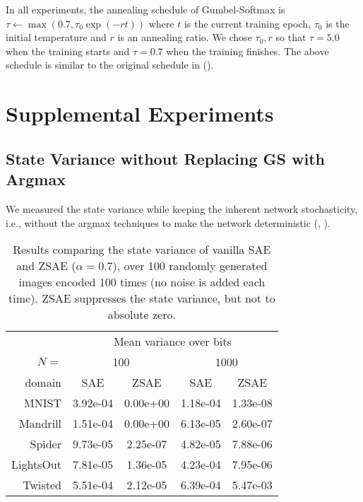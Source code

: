 \documentclass[10pt,letterpaper]{article}
\begin{document}

In all experiments, 
the annealing schedule of Gumbel-Softmax is $\tau \leftarrow \max (0.7, \tau_0\exp(-rt))$ where
 $t$ is the current training epoch, $\tau_0$ is the initial temperature and $r$ is an annealing ratio.
We chose $\tau_0,r$ so that $\tau = 5.0$ when the training starts and $\tau = 0.7$ when the training finishes.
The above schedule is similar to the original schedule in  \citeauthor{jang2016categorical} (\citeyear{jang2016categorical}).



\section{Supplemental Experiments}


\subsection{State Variance without Replacing GS with Argmax}

We measured the state variance while keeping the inherent network stochasticity,
i.e., without the argmax techniques to
make the network deterministic (, ).

\begin{table}[htbp]
 \centering
 \setlength{\tabcolsep}{0.45em}
 \begin{tabular}{|r|*{4}{c|}}
       & \multicolumn{4}{c|}{Mean variance over bits} \\
$N=$ %
     & \multicolumn{2}{c|}{100}
     & \multicolumn{2}{c|}{1000} \\
domain   &SAE      &ZSAE     &SAE      &ZSAE     \\ 
MNIST    &3.92e-04 &0.00e+00 &1.18e-04 &1.33e-08 \\ 
Mandrill &1.51e-04 &0.00e+00 &6.13e-05 &2.60e-07 \\ 
Spider   &9.73e-05 &2.25e-07 &4.82e-05 &7.88e-06 \\ 
LightsOut&7.81e-05 &1.36e-05 &4.23e-04 &7.95e-06 \\ 
Twisted  &5.51e-04 &2.12e-05 &6.39e-04 &5.47e-03 \\ 
\end{tabular}
 \caption{Results comparing the state variance of vanilla SAE and ZSAE ($\alpha=0.7$),
 over 100 randomly generated images encoded 100 times (no noise is added each time).
 ZSAE suppresses the state variance, but not to absolute zero.
 }
\label{tab:variance-stochastic}
\end{table}
\end{document}
